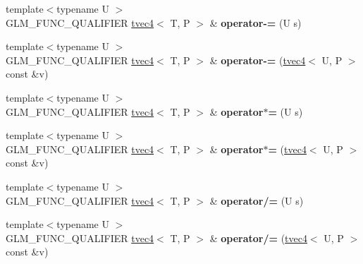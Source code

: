 \begin{DoxyCompactItemize}
\item 
{\footnotesize template$<$typename U $>$ }\\G\+L\+M\+\_\+\+F\+U\+N\+C\+\_\+\+Q\+U\+A\+L\+I\+F\+I\+ER \hyperlink{structglm_1_1detail_1_1tvec4}{tvec4}$<$ T, P $>$ \& {\bfseries operator-\/=} (U s)\hypertarget{structglm_1_1detail_1_1tvec4_a9f142d5c9e7da212eb8cad6fbd77e5d3}{}\label{structglm_1_1detail_1_1tvec4_a9f142d5c9e7da212eb8cad6fbd77e5d3}

\item 
{\footnotesize template$<$typename U $>$ }\\G\+L\+M\+\_\+\+F\+U\+N\+C\+\_\+\+Q\+U\+A\+L\+I\+F\+I\+ER \hyperlink{structglm_1_1detail_1_1tvec4}{tvec4}$<$ T, P $>$ \& {\bfseries operator-\/=} (\hyperlink{structglm_1_1detail_1_1tvec4}{tvec4}$<$ U, P $>$ const \&v)\hypertarget{structglm_1_1detail_1_1tvec4_a73b420ad2330e7ea2cd2e9b4d1df7ba9}{}\label{structglm_1_1detail_1_1tvec4_a73b420ad2330e7ea2cd2e9b4d1df7ba9}

\item 
{\footnotesize template$<$typename U $>$ }\\G\+L\+M\+\_\+\+F\+U\+N\+C\+\_\+\+Q\+U\+A\+L\+I\+F\+I\+ER \hyperlink{structglm_1_1detail_1_1tvec4}{tvec4}$<$ T, P $>$ \& {\bfseries operator$\ast$=} (U s)\hypertarget{structglm_1_1detail_1_1tvec4_a15fd0b97ca8066f1d1caaf4aa845e917}{}\label{structglm_1_1detail_1_1tvec4_a15fd0b97ca8066f1d1caaf4aa845e917}

\item 
{\footnotesize template$<$typename U $>$ }\\G\+L\+M\+\_\+\+F\+U\+N\+C\+\_\+\+Q\+U\+A\+L\+I\+F\+I\+ER \hyperlink{structglm_1_1detail_1_1tvec4}{tvec4}$<$ T, P $>$ \& {\bfseries operator$\ast$=} (\hyperlink{structglm_1_1detail_1_1tvec4}{tvec4}$<$ U, P $>$ const \&v)\hypertarget{structglm_1_1detail_1_1tvec4_aec6e3cb70054a84d657c79435b212289}{}\label{structglm_1_1detail_1_1tvec4_aec6e3cb70054a84d657c79435b212289}

\item 
{\footnotesize template$<$typename U $>$ }\\G\+L\+M\+\_\+\+F\+U\+N\+C\+\_\+\+Q\+U\+A\+L\+I\+F\+I\+ER \hyperlink{structglm_1_1detail_1_1tvec4}{tvec4}$<$ T, P $>$ \& {\bfseries operator/=} (U s)\hypertarget{structglm_1_1detail_1_1tvec4_ae55fc4ecd1c6a0dbf09d0026835f58cc}{}\label{structglm_1_1detail_1_1tvec4_ae55fc4ecd1c6a0dbf09d0026835f58cc}

\item 
{\footnotesize template$<$typename U $>$ }\\G\+L\+M\+\_\+\+F\+U\+N\+C\+\_\+\+Q\+U\+A\+L\+I\+F\+I\+ER \hyperlink{structglm_1_1detail_1_1tvec4}{tvec4}$<$ T, P $>$ \& {\bfseries operator/=} (\hyperlink{structglm_1_1detail_1_1tvec4}{tvec4}$<$ U, P $>$ const \&v)\hypertarget{structglm_1_1detail_1_1tvec4_a766fdfa0e31c0a0fd31242798ed14250}{}\label{structglm_1_1detail_1_1tvec4_a766fdfa0e31c0a0fd31242798ed14250}


\end{DoxyCompactItemize}
